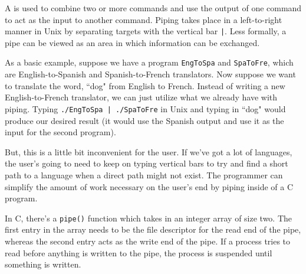 A  is used to combine two or more commands and use the output of one command to act as the input to another command. Piping takes place in a left-to-right manner in Unix by separating targets with the vertical bar \verb!|!. Less formally, a pipe can be viewed as an area in which information can be exchanged.

As a basic example, suppose we have a program \verb!EngToSpa! and \verb!SpaToFre!, which are English-to-Spanish and Spanish-to-French translators. Now suppose we want to translate the word, ``dog" from English to French. Instead of writing a new English-to-French translator, we can just utilize what we already have with piping. Typing \verb!./EngToSpa | ./SpaToFre! in Unix and typing in ``dog" would produce our desired result (it would use the Spanish output and use it as the input for the second program).


But, this is a little bit inconvenient for the user. If we've got a lot of languages, the user's going to need to keep on typing vertical bars to try and find a short path to a language when a direct path might not exist. The programmer can simplify the amount of work necessary on the user's end by piping inside of a C program.


In C, there's a \verb!pipe()! function which takes in an integer array of size two. The first entry in the array needs to be the file descriptor for the read end of the pipe, whereas the second entry acts as the write end of the pipe. If a process tries to read before anything is written to the pipe, the process is suspended until something is written.

